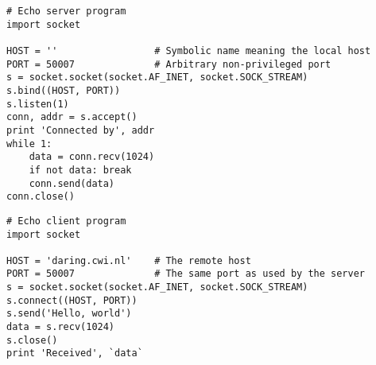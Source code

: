 \begin{verbatim}
# Echo server program
import socket

HOST = ''                 # Symbolic name meaning the local host
PORT = 50007              # Arbitrary non-privileged port
s = socket.socket(socket.AF_INET, socket.SOCK_STREAM)
s.bind((HOST, PORT))
s.listen(1)
conn, addr = s.accept()
print 'Connected by', addr
while 1:
    data = conn.recv(1024)
    if not data: break
    conn.send(data)
conn.close()
\end{verbatim}

\begin{verbatim}
# Echo client program
import socket

HOST = 'daring.cwi.nl'    # The remote host
PORT = 50007              # The same port as used by the server
s = socket.socket(socket.AF_INET, socket.SOCK_STREAM)
s.connect((HOST, PORT))
s.send('Hello, world')
data = s.recv(1024)
s.close()
print 'Received', `data`
\end{verbatim}
